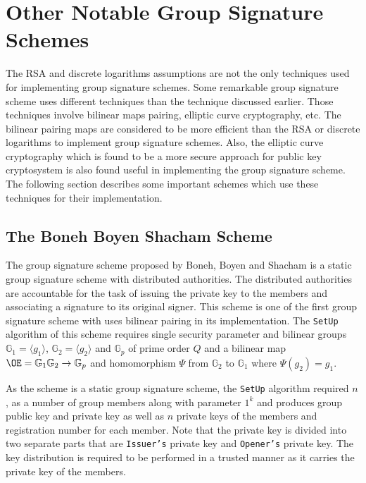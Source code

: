 \section{Other Notable Group Signature Schemes}
The RSA and discrete logarithms assumptions are not the only techniques used for implementing group signature schemes. Some remarkable group signature scheme uses different techniques than the technique discussed earlier. Those techniques involve bilinear maps pairing, elliptic curve cryptography, etc. The bilinear pairing maps are considered to be more efficient than the RSA or discrete logarithms to implement group signature schemes. Also, the elliptic curve cryptography which is found to be a more secure approach for public key cryptosystem is also found useful in implementing the group signature scheme. The following section describes some important schemes which use these techniques for their implementation.

\subsection{The Boneh Boyen Shacham Scheme}\label{BBS}
The group signature scheme proposed by Boneh, Boyen and Shacham is a static group signature scheme with distributed authorities\cite{boneh2004short}. The distributed authorities are accountable for the task of issuing the private key to the members and associating a signature to its original signer. This scheme is one of the first group signature scheme with uses bilinear pairing in its implementation. The \texttt{SetUp} algorithm of this scheme requires single security parameter and bilinear groups $\mathbb{G}_1 = \langle g_1\rangle$, $\mathbb{G}_2 = \langle g_2\rangle$ and $\mathbb{G}_p$ of prime order $Q$ and a bilinear map $\OE = \mathbb{G}_1 \mathbb{G}_2 \rightarrow \mathbb{G}_p$ and homomorphism $\Psi$ from $\mathbb{G}_2$ to $\mathbb{G}_1$ where $\Psi(g_2) = g_1$.

As the scheme is a static group signature scheme, the \texttt{SetUp} algorithm required  $n$, as a number of group members along with parameter $1^k$ and produces group public key and private key as well as $n$ private keys of the members and registration number for each member. Note that the private key is divided into two separate parts that are \texttt{Issuer's} private key and \texttt{Opener's} private key. The key distribution is required to be performed in a trusted manner as it carries the private key of the members. 

